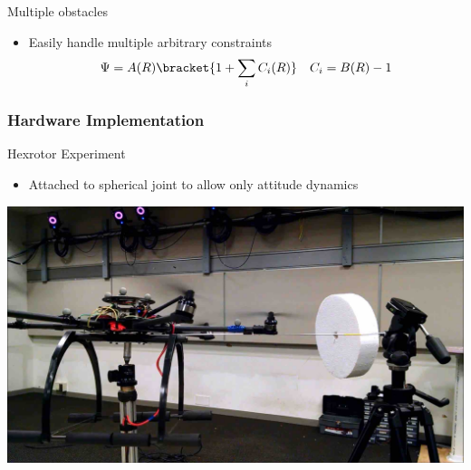 \begin{frame}{Multiple obstacles}%

\begin{itemize}
    \item Easily handle multiple arbitrary constraints 
    \begin{align*}
        \Psi = A(R) \bracket{1 + \sum_i C_i(R)} \quad C_i = B(R) - 1
    \end{align*}
\end{itemize}

\begin{center}
\end{center}

\end{frame}%

\subsubsection[Quadrotor attitude control]{Hardware Implementation}

\begin{frame}{Hexrotor Experiment} %
\begin{itemize}
    \item Attached to spherical joint to allow only attitude dynamics
\end{itemize}
\begin{center}
    \href{https://youtu.be/dsmAbwQram4?t=20s}{\includegraphics[height=0.7\textheight]{figures/2016ACC/hexrotor}}
\end{center}
\end{frame}   %
